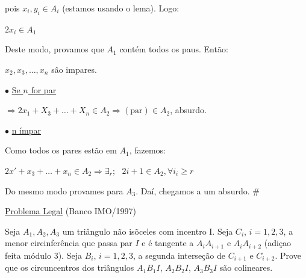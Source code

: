 \documentclass[a4paper,12pt]{article}
\theoremstyle{plain} %
\theoremstyle{definition} %
\theoremstyle{remark} %
\begin{document}
\begin{framed}
		pois $x_i, y_i\in A_i$ (estamos usando o lema). Logo:
		
		\begin{center}
			$2x_i\in A_1$
		\end{center}
		
		Deste modo, provamos que $A_1$ cont\'em todos os paus. Ent\~ao:
		
		\begin{center}
			$x_2, x_3, \dotso, x_n$ s\^ao impares.
		\end{center}
		
		$\bullet$ \hspace{1em} \underline{Se $n$ for par}
		
		$\Rightarrow 2 x_{1}+X_{3}+\ldots+X_{n} \in A_{2} \Rightarrow (\text{par}) \in A_{2}$, absurdo.
		
		$\bullet$ \hspace{1em} \underline{n \'impar}
		
		Como todos os pares est\~ao em $A_1$, fazemos:
		
		$2 x'+x_{3}+\ldots+x_{n} \in A_{2} \Rightarrow \exists_{r}; \text{ } 2 i+1 \in A_{2}, \forall i_{i} \geqslant r$
		
		Do mesmo modo provames para $A_3$. Da\'i, chegamos a um absurdo. \huge\#
		
		\normalsize
		
	\end{framed}
	
	\vspace{2ex}\underline{Problema Legal} (Banco IMO/1997)
	
	Seja $A_1, A_2, A_3$ um tri\^angulo n\~ao is\~oceles com incentro I. Seja $C_i$, $i=1, 2, 3$, a menor circinfer\^encia que passa par $I$ e \'e tangente a $A_iA_{i+1}$ e $A_iA_{i+2}$ (adi\c{c}ao feita m\'odulo 3). Seja $B_i$, $i=1, 2, 3$, a segunda interse\c{c}\~ao de $C_{i+1}$ e $C_{i+2}$. Prove que os circuncentros dos tri\^angulos $A_1 B_1 I$, $A_2 B_2 I$, $A_3 B_3 I$ s\~ao colineares.
	
\end{document}
